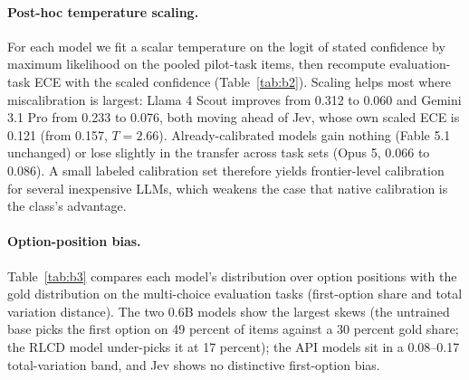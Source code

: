 \documentclass[11pt]{article}
\begin{document}
\begin{table}[!htbp]
\centering
\caption{Median evaluation-task ECE under alternative binning schemes; 15 equal-width bins is the primary metric.}
\label{tab:b1}
\small

\end{table}

\paragraph{Post-hoc temperature scaling.}
For each model we fit a scalar temperature on the logit of stated confidence by maximum likelihood on the pooled pilot-task items, then recompute evaluation-task ECE with the scaled confidence (Table~\ref{tab:b2}). Scaling helps most where miscalibration is largest: Llama 4 Scout improves from 0.312 to 0.060 and Gemini 3.1 Pro from 0.233 to 0.076, both moving ahead of Jev, whose own scaled ECE is 0.121 (from 0.157, $T = 2.66$). Already-calibrated models gain nothing (Fable 5.1 unchanged) or lose slightly in the transfer across task sets (Opus 5, 0.066 to 0.086). A small labeled calibration set therefore yields frontier-level calibration for several inexpensive LLMs, which weakens the case that native calibration is the class's advantage.

\begin{table}[!htbp]
\centering
\caption{Scalar temperature $T$ fit on the three pilot tasks and median evaluation-task ECE before and after scaling.}
\label{tab:b2}
\small

\end{table}

\paragraph{Option-position bias.}
Table~\ref{tab:b3} compares each model's distribution over option positions with the gold distribution on the multi-choice evaluation tasks (first-option share and total variation distance). The two 0.6B models show the largest skews (the untrained base picks the first option on 49 percent of items against a 30 percent gold share; the RLCD model under-picks it at 17 percent); the API models sit in a 0.08--0.17 total-variation band, and Jev shows no distinctive first-option bias.

\begin{table}[!htbp]
\centering
\caption{Option-position bias on the multi-choice evaluation tasks; TV dist.\ is the total variation distance between the predicted and gold position distributions.}
\label{tab:b3}
\small

\end{table}
\end{document}
